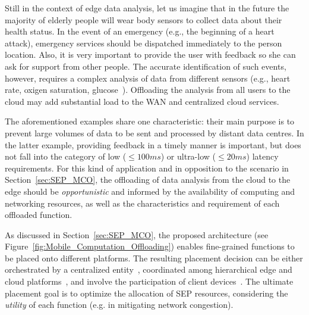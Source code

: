 Still in the context of edge data analysis, 
let us imagine that in the future the majority of elderly people will wear body sensors to collect data about their health status. In the event of an emergency (e.g., the beginning of a heart attack), emergency services should be dispatched immediately to the person location. Also, it is very important to provide the user with feedback so she can ask for support from other people.
The accurate identification of such events, however, requires a complex analysis of data from different sensors (e.g., heart rate, oxigen saturation, glucose~\cite{Li:2017}). Offloading the analysis from all users to the cloud may add substantial load to the WAN and centralized cloud services. %

The aforementioned examples share one characteristic: their main purpose is to prevent large volumes of data to be sent and processed by distant data centres. In the latter example, providing feedback in a timely manner is important, but does not fall into the category of low ($\leq 100ms$) or ultra-low ($\leq 20ms$) latency requirements. For this kind of application and in opposition to the scenario in Section~\ref{sec:SEP_MCO}, the offloading of data analysis from the cloud to the edge should be \textit{opportunistic} and informed by the availability of computing and networking resources, as well as the characteristics and requirement of each offloaded function.

As discussed in Section~\ref{sec:SEP_MCO}, the proposed architecture (see Figure~\ref{fig:Mobile_Computation_Offloading}) enables fine-grained functions to be placed onto different platforms. %
The resulting placement decision can be either orchestrated by a centralized entity~\cite{Taleb:2013}, coordinated among hierarchical edge and cloud platforms~\cite{Mach:2017}, and involve the participation of client devices~\cite{Baresi:2018}. The ultimate placement goal is to optimize the allocation of SEP resources, considering the \textit{utility} of each function (e.g. in mitigating network congestion). 

